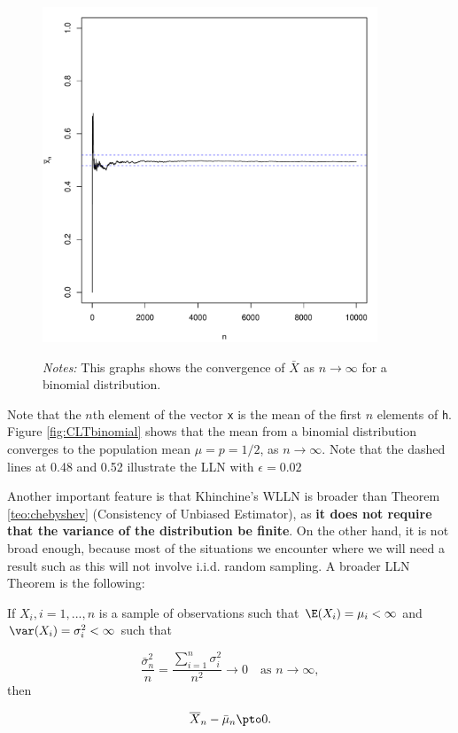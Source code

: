 \begin{example}
\begin{figure}[H]
\begin{minipage}{.9\linewidth}
\begin{knitrout}
{\centering \includegraphics[width=10cm,height=10cm]{figure/CLT-binomialPlot-1} 

}


\end{knitrout}
\footnotesize
		\emph{Notes:} This graphs shows the convergence of $\bar{X}$ as $n\to\infty$ for a binomial distribution.
	\end{minipage}
\end{figure}

Note that the $n$th element of the vector \texttt{x} is the mean of the first $n$ elements of \texttt{h}. Figure \ref{fig:CLTbinomial} shows that the mean from a binomial distribution converges to the population mean $\mu = p = 1/2$, as $n\to \infty$. Note that the dashed lines at 0.48 and 0.52 illustrate the LLN with $\epsilon = 0.02$
\end{example}


Another important feature is that Khinchine's WLLN  is broader than Theorem \ref{teo:chebyshev} (Consistency of Unbiased Estimator), as \textbf{it does not require that the variance of the distribution be finite}. On the other hand, it is not broad enough, because most of the situations we encounter where we will need a result such as this will not involve i.i.d. random sampling. A broader LLN Theorem is the following:

\begin{theorem}\label{theorem:ChebychevWLLN}
  If $X_i, i = 1,...,n$ is a sample of observations such that $\E(X_i) = \mu_i <\infty$ and $\var(X_i)=\sigma^2_i < \infty$ such that
  
\begin{equation*}
  \frac{\bar{\sigma}^2_n}{n} = \frac{\sum_{i = 1}^n\sigma_i^2}{n^2}\to 0\quad \mbox{as $n\to\infty$},
\end{equation*}
%
then

\begin{equation*}
  \overline{X}_n - \bar{\mu}_n \pto 0.
\end{equation*}
\end{theorem}

